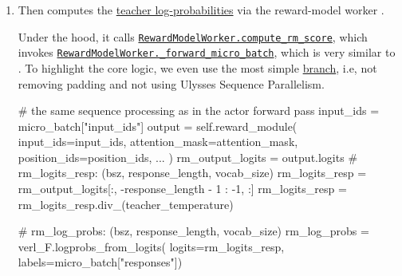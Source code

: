 \begin{enumerate}
    Therefore, for each student-visited prefix $(x,y_{<t})$,
    \[
        \texttt{student\_top\_k\_ids}
        =
        S_t
        =
        \operatorname{TopK}\!\left(
            \pi_\theta(\cdot\mid x,y_{<t})
        \right),
    \]
    and
    \[
        \texttt{student\_top\_k\_log\_probs}[i]
        =
        \log \pi_\theta(i\mid x,y_{<t}) \equiv \log p_t(i)
        \qquad i\in S_t.
    \]


    \item Then computes the
    \href{https://github.com/Thinking-Space/Rethinking-OPD/blob/ac26e38d6f1572eb027597b48a9f4e01f6915ef8/verl/verl/trainer/ppo/ray_trainer.py#L1135}
    {teacher log-probabilities} via the reward-model worker
    \newline
    . 
    
    Under the hood, it calls
    \href{https://github.com/Thinking-Space/Rethinking-OPD/blob/ac26e38d6f1572eb027597b48a9f4e01f6915ef8/verl/verl/workers/fsdp_workers.py#L2555}{\texttt{RewardModelWorker.compute\_rm\_score}}, which invokes 
    \newline
    \href{https://github.com/Thinking-Space/Rethinking-OPD/blob/ac26e38d6f1572eb027597b48a9f4e01f6915ef8/verl/verl/workers/fsdp_workers.py#L1925}{\texttt{RewardModelWorker.\_forward\_micro\_batch}}, which is very similar to . To highlight the core logic, we even use the most simple \href{https://github.com/Thinking-Space/Rethinking-OPD/blob/ac26e38d6f1572eb027597b48a9f4e01f6915ef8/verl/verl/workers/fsdp_workers.py#L2229}{branch}, i.e, not removing padding and not using Ulysses Sequence Parallelism.
    \begin{codeblock}[language=Python]
# the same sequence processing as in the actor forward pass
input_ids = micro_batch["input_ids"]        
output = self.reward_module(
    input_ids=input_ids,
    attention_mask=attention_mask,
    position_ids=position_ids,
    ...
)
rm_output_logits = output.logits
# rm_logits_resp: (bsz, response_length, vocab_size)
rm_logits_resp = rm_output_logits[:, -response_length - 1 : -1, :]  
rm_logits_resp = rm_logits_resp.div_(teacher_temperature)

# rm_log_probs: (bsz, response_length, vocab_size)
rm_log_probs = verl_F.logprobs_from_logits(
    logits=rm_logits_resp, labels=micro_batch["responses"])


\end{codeblock}
\end{enumerate}
